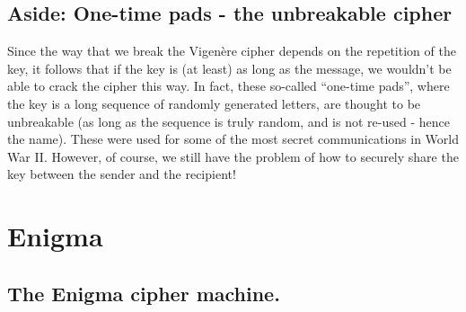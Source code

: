 \documentclass[
  letterpaper,
  DIV=11,
  numbers=noendperiod]{scrreprt}
\begin{document}
\hypertarget{aside-one-time-pads---the-unbreakable-cipher}{%
\section{Aside: One-time pads - the unbreakable
cipher}\label{aside-one-time-pads---the-unbreakable-cipher}}

Since the way that we break the Vigenère cipher depends on the
repetition of the key, it follows that if the key is (at least) as long
as the message, we wouldn't be able to crack the cipher this way. In
fact, these so-called ``one-time pads'', where the key is a long
sequence of randomly generated letters, are thought to be unbreakable
(as long as the sequence is truly random, and is not re-used - hence the
name). These were used for some of the most secret communications in
World War II. However, of course, we still have the problem of how to
securely share the key between the sender and the recipient!

\hypertarget{enigma}{%
\chapter{Enigma}\label{enigma}}

\hypertarget{the-enigma-cipher-machine.}{%
\section{The Enigma cipher machine.}\label{the-enigma-cipher-machine.}}
\end{document}

